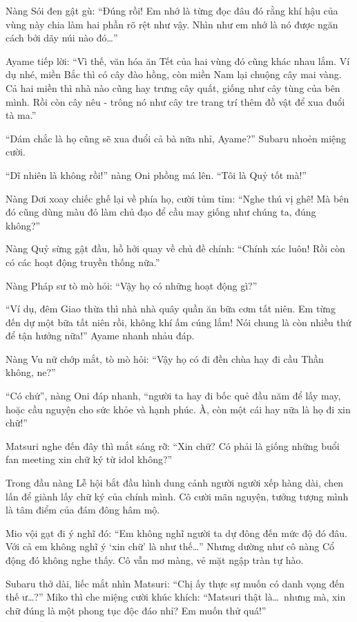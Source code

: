 \documentclass[../main.tex]{subfiles}
\begin{document}
Nàng Sói đen gật gù: ``Đúng rồi! Em nhớ là từng đọc đâu đó rằng khí hậu của vùng này chia làm hai phần rõ rệt như vậy. Nhìn như em nhớ là nó được ngăn cách bởi dãy núi nào đó\dots''

Ayame tiếp lời: ``Vì thế, văn hóa ăn Tết của hai vùng đó cũng khác nhau lắm. Ví dụ nhé, miền Bắc thì có cây đào hồng, còn miền Nam lại chuộng cây mai vàng. Cả hai miền thì nhà nào cũng hay trưng cây quất, giống như cây tùng của bên mình. Rồi còn cây nêu - trông nó như cây tre trang trí thêm đồ vật để xua đuổi tà ma.''

``Dám chắc là họ cũng sẽ xua đuổi cả bà nữa nhỉ, Ayame?'' Subaru nhoẻn miệng cười.

``Dĩ nhiên là không rồi!'' nàng Oni phồng má lên. ``Tôi là Quỷ tốt mà!''

Nàng Dơi xoay chiếc ghế lại về phía họ, cười tủm tỉm: ``Nghe thú vị ghê! Mà bên đó cũng dùng màu đỏ làm chủ đạo để cầu may giống như chúng ta, đúng không?''

Nàng Quỷ sừng gật đầu, hồ hởi quay về chủ đề chính: ``Chính xác luôn! Rồi còn có các hoạt động truyền thống nữa.''

Nàng Pháp sư tò mò hỏi: ``Vậy họ có những hoạt động gì?''

``Ví dụ, đêm Giao thừa thì nhà nhà quây quần ăn bữa cơm tất niên. Em từng đến dự một bữa tất niên rồi, không khí ấm cúng lắm! Nói chung là còn nhiều thứ để tận hưởng nữa!'' Ayame nhanh nhảu đáp.

Nàng Vu nữ chớp mắt, tò mò hỏi: ``Vậy họ có đi đền chùa hay đi cầu Thần không, ne?''

``Có chứ'', nàng Oni đáp nhanh, ``người ta hay đi bốc quẻ đầu năm để lấy may, hoặc cầu nguyện cho sức khỏe và hạnh phúc. À, còn một cái hay nữa là họ đi xin chữ!''

Matsuri nghe đến đây thì mắt sáng rỡ: ``Xin chữ? Có phải là giống những buổi fan meeting xin chữ ký từ idol không?''

Trong đầu nàng Lễ hội bắt đầu hình dung cảnh người người xếp hàng dài, chen lấn để giành lấy chữ ký của chính mình. Cô cười mãn nguyện, tưởng tượng mình là tâm điểm của đám đông hâm mộ.

Mio vội gạt đi ý nghĩ đó: ``Em không nghĩ người ta dự đông đến mức độ đó đâu. Với cả em không nghĩ ý `xin chữ' là như thế\dots'' Nhưng dường như cô nàng Cổ động đó không nghe thấy. Cô vẫn mơ màng, vẻ mặt ngập tràn tự hào.

Subaru thở dài, liếc mắt nhìn Matsuri: ``Chị ấy thực sự muốn có danh vọng đến thế ư\dots?'' Miko thì che miệng cười khúc khích: ``Matsuri thật là\dots\ nhưng mà, xin chữ đúng là một phong tục độc đáo nhỉ? Em muốn thử quá!''
\end{document}
